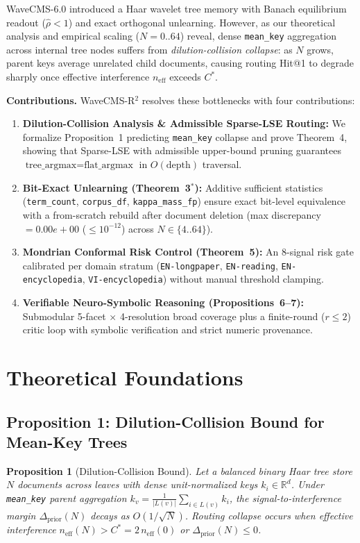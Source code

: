 \documentclass[conference]{IEEEtran}
\newtheorem{proposition}{Proposition}
\begin{document}
WaveCMS-6.0 introduced a Haar wavelet tree memory with Banach equilibrium readout ($\hat{\rho} < 1$) and exact orthogonal unlearning. However, as our theoretical analysis and empirical scaling ($N=0..64$) reveal, dense \texttt{mean\_key} aggregation across internal tree nodes suffers from \emph{dilution-collision collapse}: as $N$ grows, parent keys average unrelated child documents, causing routing Hit@1 to degrade sharply once effective interference $n_{\text{eff}}$ exceeds $C^*$.

\textbf{Contributions.} WaveCMS-R$^2$ resolves these bottlenecks with four contributions:
\begin{enumerate}
    \item \textbf{Dilution-Collision Analysis \& Admissible Sparse-LSE Routing:} We formalize Proposition~1 predicting \texttt{mean\_key} collapse and prove Theorem~4, showing that Sparse-LSE with admissible upper-bound pruning guarantees $\text{tree\_argmax} = \text{flat\_argmax}$ in $O(\text{depth})$ traversal.
    \item \textbf{Bit-Exact Unlearning (Theorem~3$^*$):} Additive sufficient statistics (\texttt{term\_count}, \texttt{corpus\_df}, \texttt{kappa\_mass\_fp}) ensure exact bit-level equivalence with a from-scratch rebuild after document deletion (max discrepancy $= 0.00e+00$ ($\le 10^{-12}$) across $N \in \{4..64\}$).
    \item \textbf{Mondrian Conformal Risk Control (Theorem~5):} An 8-signal risk gate calibrated per domain stratum (\texttt{EN-longpaper}, \texttt{EN-reading}, \texttt{EN-encyclopedia}, \texttt{VI-encyclopedia}) without manual threshold clamping.
    \item \textbf{Verifiable Neuro-Symbolic Reasoning (Propositions~6--7):} Submodular 5-facet $\times$ 4-resolution broad coverage plus a finite-round ($r \le 2$) critic loop with symbolic verification and strict numeric provenance.
\end{enumerate}

\section{Theoretical Foundations}

\subsection{Proposition 1: Dilution-Collision Bound for Mean-Key Trees}
\begin{proposition}[Dilution-Collision Bound]
Let a balanced binary Haar tree store $N$ documents across leaves with dense unit-normalized keys $k_i \in \mathbb{R}^d$. Under \texttt{mean\_key} parent aggregation $k_v = \frac{1}{|L(v)|} \sum_{i \in L(v)} k_i$, the signal-to-interference margin $\Delta_{\text{prior}}(N)$ decays as $O(1/\sqrt{N})$. Routing collapse occurs when effective interference $n_{\text{eff}}(N) > C^* = 2\,n_{\text{eff}}(0)$ or $\Delta_{\text{prior}}(N) \le 0$.
\end{proposition}
\end{document}
